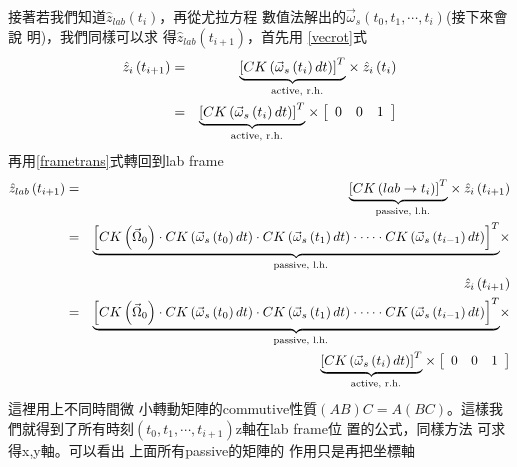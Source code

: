 \documentclass{article}
\begin{document}
接著若我們知道$\hat{z}_{lab}\left(
t_{i}\right) $，再從尤拉方程%
數值法解出的$\vec{\omega}_{s}\left(
t_{0},t_{1},\cdots ,t_{i}\right) $(接下來會說%
明)，我們同樣可以求%
得$\hat{z}_{lab}\left( t_{i+1}\right) $，首先用%
\ref{vecrot}式%
\begin{eqnarray*}
\hat{z}_{i}\left( t_{i+1}\right) &=&\underset{\text{active, r.h.}}{%
\underbrace{\left[ CK\left( \vec{\omega}_{s}\left( t_{i}\right) dt\right) %
\right] ^{T}}}\times \hat{z}_{i}\left( t_{i}\right) \\
&=&\underset{\text{active, r.h.}}{\underbrace{\left[ CK\left( \vec{\omega}%
_{s}\left( t_{i}\right) dt\right) \right] ^{T}}}\times \left[ 
\begin{array}{ccc}
0 & 0 & 1%
\end{array}%
\right]
\end{eqnarray*}%
再用\ref{frametrans}式轉回到lab frame%
\begin{eqnarray}
\hat{z}_{lab}\left( t_{i+1}\right) &=&\underset{\text{passive, l.h.}}{%
\underbrace{\left[ CK\left( lab\rightarrow t_{i}\right) \right] ^{T}}}\times 
\hat{z}_{i}\left( t_{i+1}\right)  \notag \\
&=&\underset{\text{passive, l.h.}}{\underbrace{\left[ CK\left( \vec{\Omega}%
_{0}\right) \cdot CK\left( \vec{\omega}_{s}\left( t_{0}\right) dt\right)
\cdot CK\left( \vec{\omega}_{s}\left( t_{1}\right) dt\right) \cdot \cdots
\cdot CK\left( \vec{\omega}_{s}\left( t_{i-1}\right) dt\right) \right] ^{T}}}%
\times  \notag \\
&&\hat{z}_{i}\left( t_{i+1}\right)  \notag \\
&=&\underset{\text{passive, l.h.}}{\underbrace{\left[ CK\left( \vec{\Omega}%
_{0}\right) \cdot CK\left( \vec{\omega}_{s}\left( t_{0}\right) dt\right)
\cdot CK\left( \vec{\omega}_{s}\left( t_{1}\right) dt\right) \cdot \cdots
\cdot CK\left( \vec{\omega}_{s}\left( t_{i-1}\right) dt\right) \right] ^{T}}}%
\times  \notag \\
&&\underset{\text{active, r.h.}}{\underbrace{\left[ CK\left( \vec{\omega}%
_{s}\left( t_{i}\right) dt\right) \right] ^{T}}}\times \left[ 
\begin{array}{ccc}
0 & 0 & 1%
\end{array}%
\right]  \label{iterateeq0}
\end{eqnarray}%
這裡用上不同時間微%
小轉動矩陣的commutive性質$%
\left( AB\right) C=A\left( BC\right) $。這樣我%
們就得到了所有時刻$%
\left( t_{0},t_{1},\cdots ,t_{i+1}\right) $z軸在lab frame位%
置的公式，同樣方法%
可求得x,y軸。可以看出%
上面所有passive的矩陣的%
作用只是再把坐標軸%
\end{document}
